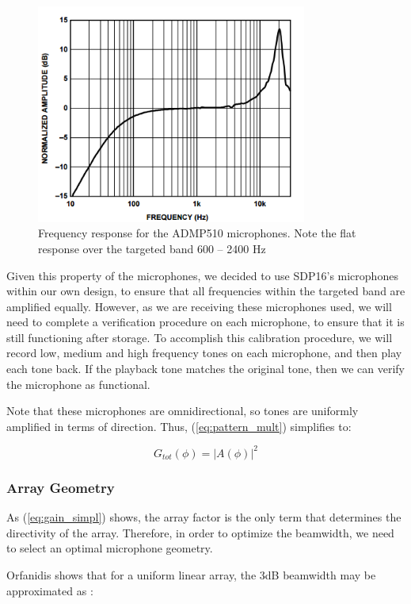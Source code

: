 \documentclass[10pt,journal,compsoc]{IEEEtran}
\begin{document}
\begin{figure}
    \centering
    \includegraphics[width=3.5in]{mic_response}
    \caption{Frequency response for the ADMP510 microphones. Note the flat response over the targeted band 600 – 2400 Hz}
    \label{fig:mic_response}
\end{figure}

Given this property of the microphones, we decided to use SDP16’s microphones within our own design, to ensure that all frequencies within the targeted band are amplified equally. However, as we are receiving these microphones used, we will need to complete a verification procedure on each microphone, to ensure that it is still functioning after storage. To accomplish this calibration procedure, we will record low, medium and high frequency tones on each microphone, and then play each tone back. If the playback tone matches the original tone, then we can verify the microphone as functional.

Note that these microphones are omnidirectional, so tones are uniformly amplified in terms of direction. Thus,  (\ref{eq:pattern_mult}) simplifies to:

\begin{equation}
\label{eq:gain_simpl}
G_{tot}(\phi) = |A(\phi)|^2
\end{equation}

\subsubsection{Array Geometry}
As (\ref{eq:gain_simpl}) shows, the array factor is the only term that determines the directivity of the array. Therefore, in order to optimize the beamwidth, we need to select an optimal microphone geometry.

Orfanidis shows that for a uniform linear array, the 3dB beamwidth may be approximated as \cite{sophocles}:
\end{document}
